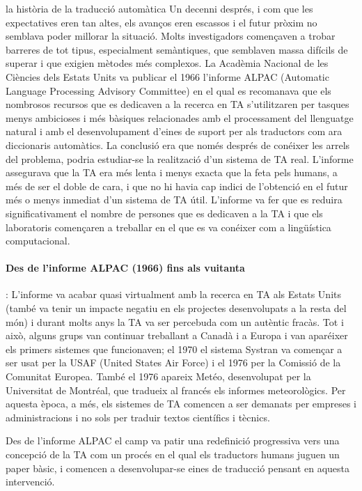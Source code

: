 \begin{persabermes}{la història de la traducció automàtica}
Un decenni després, i com que les expectatives eren tan altes, els
avanços eren escassos i el futur pròxim no semblava poder millorar la
situació.  Molts investigadors començaven a trobar barreres de tot
tipus, especialment semàntiques, que semblaven massa difícils de
superar i que exigien mètodes més complexos. La Acadèmia Nacional de
les Ciències dels Estats Units va publicar el 1966 l'informe ALPAC
(Automatic Language Processing Advisory Committee) en el qual es
recomanava que els nombrosos recursos que es dedicaven a la recerca en
TA s'utilitzaren per tasques menys ambicioses i més bàsiques
relacionades amb el processament del llenguatge natural i amb el
desenvolupament d'eines de suport per als traductors com ara
diccionaris automàtics.  La conclusió era que només després de
conéixer les arrels del problema, podria estudiar-se la realització
d'un sistema de TA real. L'informe assegurava que la TA era més lenta
i menys exacta que la feta pels humans, a més de ser el doble de cara,
i que no hi havia cap indici de l'obtenció en el futur més o menys
inmediat d'un sistema de TA útil.  L'informe va fer que es reduira
significativament el nombre de persones que es dedicaven a la TA i que
els laboratoris començaren a treballar en el que es va conéixer com a
lingüística computacional.

\paragraph{Des de l'informe ALPAC (1966) fins als vuitanta}: L'informe
va acabar quasi virtualment amb la recerca en TA als Estats Units
(també va tenir un impacte negatiu en els projectes desenvolupats a la
resta del món) i durant molts anys la TA va ser percebuda com un
autèntic fracàs. Tot i això, alguns grups van continuar treballant a
Canadà i a Europa i van aparéixer els primers sistemes que
funcionaven; el 1970 el sistema Systran va començar a ser usat per la
USAF (United States Air Force) i el 1976 per la Comissió de la
Comunitat Europea.  També el 1976 apareix Metéo, desenvolupat per la
Universitat de Montréal, que tradueix al francés els informes
meteorològics.  Per aquesta època, a més, els sistemes de TA comencen
a ser demanats per empreses i administracions i no sols per traduir
textos científics i tècnics.

Des de l'informe ALPAC el camp va patir una redefinició progressiva
vers una concepció de la TA com un procés en el qual els traductors
humans juguen un paper bàsic, i comencen a desenvolupar-se eines de
traducció pensant en aquesta intervenció.


\end{persabermes}
